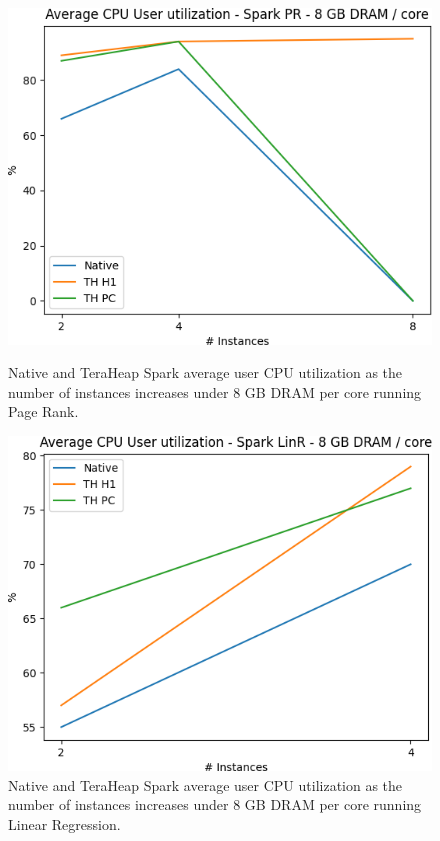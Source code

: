 \begin{figure}[thbp]
        \centering
        \includegraphics[width=\linewidth]{./fig/PR_64_USR.png}
    \caption{Native and TeraHeap Spark average user CPU utilization
        as the number of instances increases under 8 GB DRAM per core running Page Rank.}
                \label{fig:pr_64_usr}

        \includegraphics[width=\linewidth]{./fig/LINR_64_USR.png}
    \caption{Native and TeraHeap Spark average user CPU utilization
        as the number of instances increases under 8 GB DRAM per core running Linear Regression.}
                \label{fig:linr_64_usr}
\end{figure}


